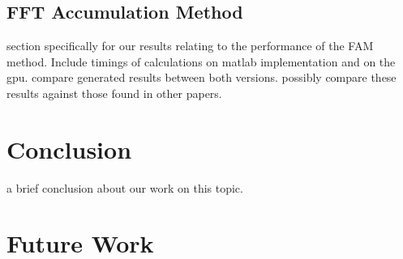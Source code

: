 \subsection{FFT Accumulation Method}
\label{sect:FAM_result}
section specifically for our results relating to the performance of the FAM method.  Include timings of calculations on matlab implementation and on the gpu.  compare generated results between both versions.  possibly compare these results against those found in other papers.

\section{Conclusion}
a brief conclusion about our work on this topic.

\section{Future Work}
